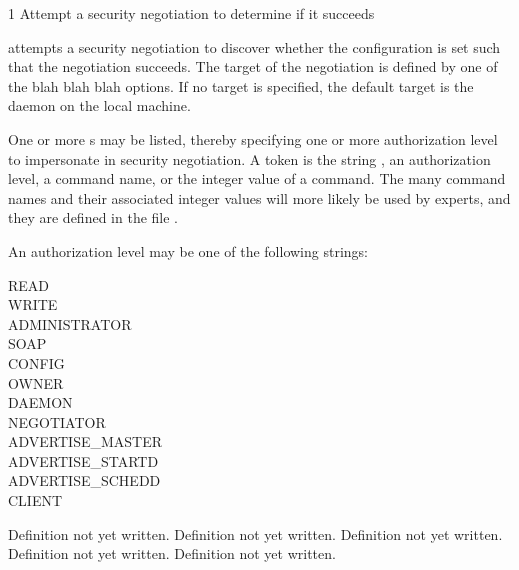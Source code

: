 \begin{ManPage}{\label{man-condor-ping}}{1}
{Attempt a security negotiation to determine if it succeeds}
\Synopsis {}
\ToolArgsBase



\Description
{} attempts a security negotiation to discover whether the
configuration is set such that the negotiation succeeds.
The target of the negotiation is defined by one of 
the blah blah blah options.
If no target is specified,
the default target is the  daemon on the local machine.

One or more s may be listed,
thereby specifying one or more authorization level to impersonate in
security negotiation.
A token is the string , an authorization level,
a command name, or the integer value of a command.
The many command names and their associated integer values will more
likely be used by experts,
and they are defined in the file . 

An authorization level may be one of the following strings:
\begin{description}
\item[READ]
\item[WRITE]
\item[ADMINISTRATOR]
\item[SOAP]
\item[CONFIG]
\item[OWNER]
\item[DAEMON]
\item[NEGOTIATOR]
\item[ADVERTISE\_MASTER]
\item[ADVERTISE\_STARTD]
\item[ADVERTISE\_SCHEDD]
\item[CLIENT]
\end{description}



\begin{Options}
    \ToolArgsBaseDesc
            {Definition not yet written.
	    }
            {Definition not yet written.
	    }
            {Definition not yet written.
	    }
            {Definition not yet written.
	    }
            {Definition not yet written.
	    }
\end{Options}


\end{ManPage}
